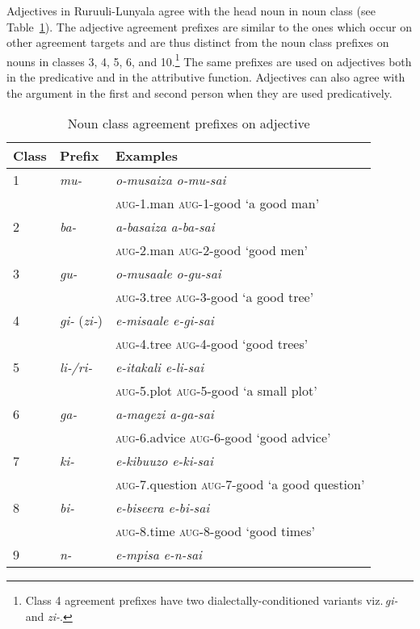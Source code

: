 Adjectives in Ru\-ruu\-li\hyp{}Lu\-nya\-la agree with the head noun in noun class (see Table~\ref{tab-adjectives}).
The adjective agreement prefixes are similar to the ones which occur on other agreement targets and are thus distinct from the noun class prefixes on nouns in classes 3, 4, 5, 6, and 10.\footnote{Class 4 agreement prefixes have two dialectally-conditioned variants viz.\,\textit{gi-} and \textit{zi-}.}
The same prefixes are used on adjectives both in the predicative and in the attributive function. 
Adjectives can also agree with the argument in the first and second person when they are used predicatively. 

\begin{table}[]
\caption{Noun class agreement prefixes on adjective}
\label{tab-adjectives}
\begin{tabularx}{\textwidth}{XXl}
\lsptoprule
Class & Prefix & Examples\\
\midrule
1  & \textit{mu-} & \textit{o-musaiza o-mu-sai}\\
  & 		     & \textsc{aug}-1.man \textsc{aug}-1-good ‘a good man’\\
2 & \textit{ba-} & \textit{a-basaiza a-ba-sai}\\
   & 			& \textsc{aug}-2.man \textsc{aug}-2-good ‘good men’\\
3 & \textit{gu-} & \textit{o-musaale o-gu-sai}\\
   & 			&\textsc{aug}-3.tree \textsc{aug}-3-good ‘a good tree’\\
4 & \textit{gi-} (\textit{zi-})& \textit{e-misaale e-gi-sai}\\
   & 			&\textsc{aug}-4.tree \textsc{aug}-4-good ‘good trees’\\
5 & \textit{li-/ri-} & \textit{e-itakali e-li-sai}\\
   & 			&\textsc{aug}-5.plot \textsc{aug}-5-good ‘a small plot’\\
6  & \textit{ga-} & \textit{a-magezi a-ga-sai}\\
   & 			&\textsc{aug}-6.advice \textsc{aug}-6-good ‘good advice’\\
7 & \textit{ki-} & \textit{e-kibuuzo e-ki-sai}\\
   & 		      &\textsc{aug}-7.question \textsc{aug}-7-good ‘a good question’\\
8  & \textit{bi-} & \textit{e-biseera e-bi-sai}\\
   & 			&\textsc{aug}-8.time \textsc{aug}-8-good ‘good times’\\
9 & \textit{n-}  & \textit{e-mpisa e-n-sai}\\

\end{tabularx}
\end{table}

